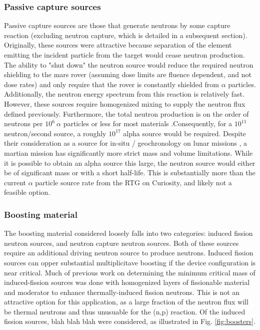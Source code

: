 \documentclass{mc2015}
\begin{document}
\subsubsection{Passive capture sources}

Passive capture sources \cite{weise_neutron_1984,jacobs_energy_1983,marsh_high_1995} are those that generate neutrons by some capture reaction (excluding neutron capture, which is detailed in a subsequent section). Originally, these sources were attractive because separation of the element emitting the incident particle from the target would cease neutron production. The ability to "shut down" the neutron source would reduce the required neutron shielding to the mars rover (assuming dose limits are fluence dependent, and not dose rates) and only require that the rover is constantly shielded from $\alpha$ particles.  Additionally, the neutron energy spectrum from this reaction is relatively fast. However, these sources require homogenized mixing to supply the neutron flux defined previously. Furthermore, the total neutron production is on the order of neutrons per $10^6\:\alpha$ particles or less for most materials \cite{weise_neutron_1984,jacobs_energy_1983}.Consequently, for a $10^{11}$ neutron/second source, a roughly $10^{17}$ alpha source would be required. Despite their consideration as a source for in-situ / geochronology on lunar missions \cite{li_evaluation_2011}, a martian mission has significantly more strict mass and volume limitations. While it is possible to obtain an alpha source this large, the neutron source would either be of significant mass or with a short half-life. This is substantially more than the current $\alpha$ particle source rate from the RTG on Curiosity, and likely not a feasible option. 

\subsubsection{Boosting material}

The boosting material considered loosely falls into two categories: induced fission neutron sources, and neutron capture neutron sources. Both of these sources require an additional driving neutron source to produce neutrons. Induced fission sources can opper substantial multiplicitave boosting if the device configuration is near critical.  Much of previous work on determining the minimum critical mass of induced-fission sources \cite{karni_semi-automated_keff,karni_smores_2003,goluoglu_smoresnew_2002} was done with homogenized layers of fissionable material and moderator to enhance thermally-induced fission neutrons. This is not an attractive option for this application, as a large fraction of the neutron flux will be thermal neutrons and thus unusuable for the (n,p) reaction. Of the induced fission sources, blah blah blah were considered, as illustrated in Fig. \ref{fig:boosters}.
\end{document}
